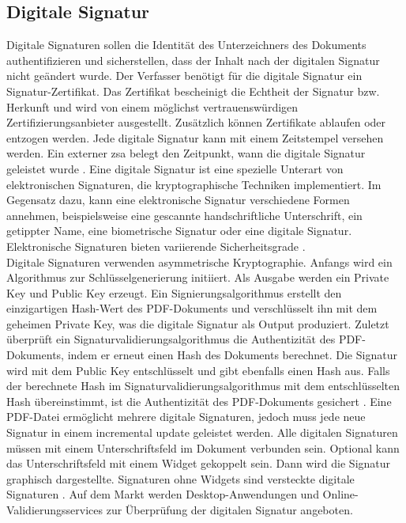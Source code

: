 \subsection{Digitale Signatur}
Digitale Signaturen sollen die Identität des Unterzeichners des Dokuments authentifizieren und sicherstellen, dass der Inhalt nach der digitalen Signatur nicht geändert wurde. Der Verfasser benötigt für die digitale Signatur ein Signatur-Zertifikat. Das Zertifikat bescheinigt die Echtheit der Signatur bzw. Herkunft und wird von einem möglichst vertrauenswürdigen Zertifizierungsanbieter ausgestellt. Zusätzlich können Zertifikate ablaufen oder entzogen werden. Jede digitale Signatur kann mit einem Zeitstempel versehen werden. Ein externer \gls{zsa} belegt den Zeitpunkt, wann die digitale Signatur geleistet wurde \cite{softx}. Eine digitale Signatur ist eine spezielle Unterart von elektronischen Signaturen, die kryptographische Techniken implementiert. Im Gegensatz dazu, kann eine elektronische Signatur verschiedene Formen annehmen, beispielsweise eine gescannte handschriftliche Unterschrift, ein getippter Name, eine biometrische Signatur oder eine digitale Signatur. Elektronische Signaturen bieten variierende Sicherheitsgrade \cite{adobe-pdf-pades}. \\
Digitale Signaturen verwenden asymmetrische Kryptographie. Anfangs wird ein Algorithmus zur Schlüsselgenerierung initiiert. Als Ausgabe werden ein Private Key und Public Key erzeugt. Ein Signierungsalgorithmus erstellt den einzigartigen Hash-Wert des PDF-Dokuments und verschlüsselt ihn mit dem geheimen Private Key, was die digitale Signatur als Output produziert. Zuletzt überprüft ein Signaturvalidierungsalgorithmus die Authentizität des PDF-Dokuments, indem er erneut einen Hash des Dokuments berechnet. Die Signatur wird mit dem Public Key entschlüsselt und gibt ebenfalls einen Hash aus. Falls der berechnete Hash im Signaturvalidierungsalgorithmus mit dem entschlüsselten Hash übereinstimmt, ist die Authentizität des PDF-Dokuments gesichert \cite{signature}. Eine PDF-Datei ermöglicht mehrere digitale Signaturen, jedoch muss jede neue Signatur in einem incremental update geleistet werden. Alle digitalen Signaturen müssen mit einem Unterschriftsfeld im Dokument verbunden sein. Optional kann das Unterschriftsfeld mit einem Widget gekoppelt sein. Dann wird die Signatur graphisch dargestellte. Signaturen ohne Widgets sind versteckte digitale Signaturen \cite{softx}. Auf dem Markt werden Desktop-Anwendungen und Online-Validierungsservices zur Überprüfung der digitalen Signatur angeboten.


